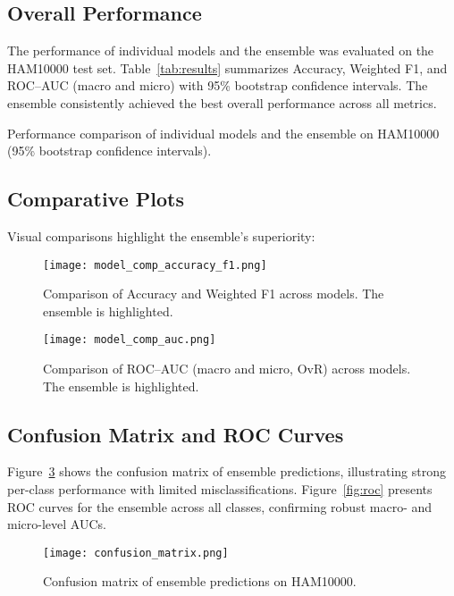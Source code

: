 \documentclass[preprint,12pt]{elsarticle}
\begin{document}
\subsection{Overall Performance}
The performance of individual models and the ensemble was evaluated on the HAM10000 test set.  
Table~\ref{tab:results} summarizes Accuracy, Weighted F1, and ROC--AUC (macro and micro) with 95\% bootstrap confidence intervals.  
The ensemble consistently achieved the best overall performance across all metrics.  

\begin{table}[htbp]
  \centering
  \caption{Performance comparison of individual models and the ensemble on HAM10000 (95\% bootstrap confidence intervals).}
  \label{tab:results}
  
\end{table}

\subsection{Comparative Plots}
Visual comparisons highlight the ensemble’s superiority:  

\begin{figure}[htbp]
\centering
\texttt{[image: model\_comp\_accuracy\_f1.png]}
\caption{Comparison of Accuracy and Weighted F1 across models. The ensemble is highlighted.}
\label{fig:accf1}
\end{figure}

\begin{figure}[htbp]
\centering
\texttt{[image: model\_comp\_auc.png]}
\caption{Comparison of ROC--AUC (macro and micro, OvR) across models. The ensemble is highlighted.}
\label{fig:auc}
\end{figure}

\subsection{Confusion Matrix and ROC Curves}
Figure~\ref{fig:confmat} shows the confusion matrix of ensemble predictions, illustrating strong per-class performance with limited misclassifications.  
Figure~\ref{fig:roc} presents ROC curves for the ensemble across all classes, confirming robust macro- and micro-level AUCs.  

\begin{figure}[htbp]
\centering
\texttt{[image: confusion\_matrix.png]}
\caption{Confusion matrix of ensemble predictions on HAM10000.}
\label{fig:confmat}
\end{figure}
\end{document}
